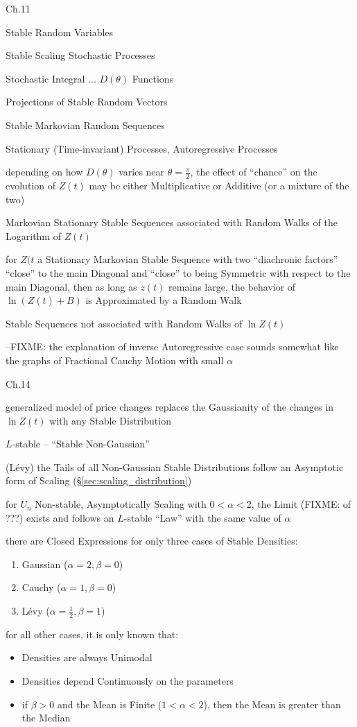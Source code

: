 Ch.11

Stable Random Variables

Stable Scaling Stochastic Processes

Stochastic Integral ... $D(\theta)$ Functions

Projections of Stable Random Vectors

Stable Markovian Random Sequences

Stationary (Time-invariant) Processes, Autoregressive Processes

depending on how $D(\theta)$ varies near $\theta = \frac{\pi}{2}$, the effect of
``chance'' on the evolution of $Z(t)$ may be either Multiplicative or Additive
(or a mixture of the two)

Markovian Stationary Stable Sequences associated with Random Walks of the
Logarithm of $Z(t)$

for $Z(t$ a Stationary Markovian Stable Sequence with two ``diachronic factors''
``close'' to the main Diagonal and ``close'' to being Symmetric with respect to
the main Diagonal, then as long as $z(t)$ remains large, the behavior of
$\ln(Z(t) + B)$ is Approximated by a Random Walk

Stable Sequences not associated with Random Walks of $\ln Z(t)$

--FIXME: the explanation of inverse Autoregressive case sounds somewhat like the
graphs of Fractional Cauchy Motion with small $\alpha$

Ch.14

generalized model of price changes replaces the Gaussianity of the changes in
$\ln Z(t)$ with any Stable Distribution

$L$-stable -- ``Stable Non-Gaussian''

(L\'evy) the Tails of all Non-Gaussian Stable Distributions follow an Asymptotic
form of Scaling (\S\ref{sec:scaling_distribution})

for $U_n$ Non-stable, Asymptotically Scaling with $0 < \alpha < 2$, the Limit
(FIXME: of ???) exists and follows an $L$-stable ``Law'' with the same value of
$\alpha$

there are Closed Expressions for only three cases of Stable Densities:
\begin{enumerate}
  \item Gaussian ($\alpha = 2, \beta = 0$)
  \item Cauchy ($\alpha = 1, \beta = 0$)
  \item L\'evy ($\alpha = \frac{1}{2}, \beta = 1$)
\end{enumerate}
for all other cases, it is only known that:
\begin{itemize}
  \item Densities are always Unimodal
  \item Densities depend Continuously on the parameters
  \item if $\beta > 0$ and the Mean is Finite ($1 < \alpha < 2$), then the Mean
    is greater than the Median
\end{itemize}

